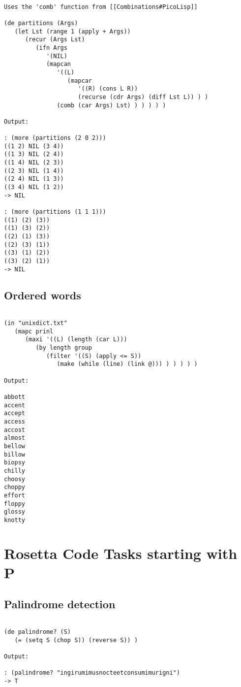 \begin{verbatim}

Uses the 'comb' function from [[Combinations#PicoLisp]]

(de partitions (Args)
   (let Lst (range 1 (apply + Args))
      (recur (Args Lst)
         (ifn Args
            '(NIL)
            (mapcan
               '((L)
                  (mapcar
                     '((R) (cons L R))
                     (recurse (cdr Args) (diff Lst L)) ) )
               (comb (car Args) Lst) ) ) ) ) )

Output:

: (more (partitions (2 0 2)))
((1 2) NIL (3 4))
((1 3) NIL (2 4))
((1 4) NIL (2 3))
((2 3) NIL (1 4))
((2 4) NIL (1 3))
((3 4) NIL (1 2))
-> NIL

: (more (partitions (1 1 1)))
((1) (2) (3))
((1) (3) (2))
((2) (1) (3))
((2) (3) (1))
((3) (1) (2))
((3) (2) (1))
-> NIL

\end{verbatim}

\section*{Ordered words}

\begin{verbatim}

(in "unixdict.txt"
   (mapc prinl
      (maxi '((L) (length (car L)))
         (by length group
            (filter '((S) (apply <= S))
               (make (while (line) (link @))) ) ) ) ) )

Output:

abbott
accent
accept
access
accost
almost
bellow
billow
biopsy
chilly
choosy
choppy
effort
floppy
glossy
knotty

\end{verbatim}

\chapter{Rosetta Code Tasks starting with P}

\section*{Palindrome detection}

\begin{verbatim}

(de palindrome? (S)
   (= (setq S (chop S)) (reverse S)) )

Output:

: (palindrome? "ingirumimusnocteetconsumimurigni")
-> T

\end{verbatim}

